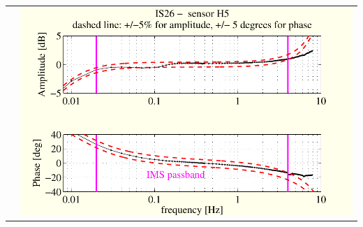 \documentclass[handout,10pt]{beamer}
\begin{document}
\begin{frame}
\begin{tabular}{c||c}
&
\includegraphics[scale=0.35]{3monthsonIS26SUTboxplot5withSensor.pdf}
\end{tabular}
\end{frame}
\end{document}
